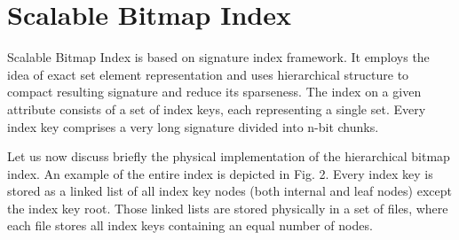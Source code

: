 \documentclass[12pt, a4paper]{article}
\begin{document}
\section{Scalable Bitmap Index}

Scalable Bitmap Index is based on signature index framework. It employs the idea of exact set element representation and uses hierarchical structure to compact resulting signature and reduce its sparseness. The index on a given attribute consists of a set of index keys, each representing a single set. Every index key comprises a very long signature divided into n-bit chunks.

Let us now discuss briefly the physical implementation of the hierarchical bitmap index. An example of the entire index is depicted in Fig. 2. Every index key is stored as a linked list of all index key nodes (both internal and leaf nodes) except the index key root. Those linked lists are stored physically in a set of files, where each file stores all index keys containing an equal number of nodes.

\citep{name}



\end{document}
